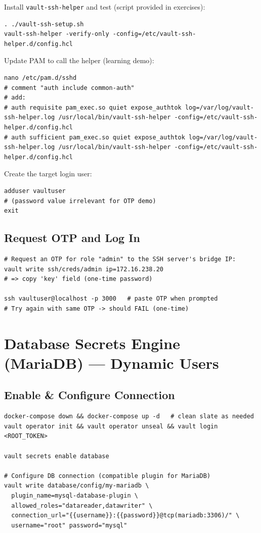 \documentclass[11pt]{article}
\begin{document}
Install \texttt{vault-ssh-helper} and test (script provided in exercises):
\begin{verbatim}
. ./vault-ssh-setup.sh
vault-ssh-helper -verify-only -config=/etc/vault-ssh-helper.d/config.hcl
\end{verbatim}

Update PAM to call the helper (learning demo):
\begin{verbatim}
nano /etc/pam.d/sshd
# comment "auth include common-auth"
# add:
# auth requisite pam_exec.so quiet expose_authtok log=/var/log/vault-ssh-helper.log /usr/local/bin/vault-ssh-helper -config=/etc/vault-ssh-helper.d/config.hcl
# auth sufficient pam_exec.so quiet expose_authtok log=/var/log/vault-ssh-helper.log /usr/local/bin/vault-ssh-helper -config=/etc/vault-ssh-helper.d/config.hcl
\end{verbatim}

Create the target login user:
\begin{verbatim}
adduser vaultuser
# (password value irrelevant for OTP demo)
exit
\end{verbatim}

\subsection*{Request OTP and Log In}
\begin{verbatim}
# Request an OTP for role "admin" to the SSH server's bridge IP:
vault write ssh/creds/admin ip=172.16.238.20
# => copy 'key' field (one-time password)

ssh vaultuser@localhost -p 3000   # paste OTP when prompted
# Try again with same OTP -> should FAIL (one-time)
\end{verbatim}

\section{Database Secrets Engine (MariaDB) — Dynamic Users}
\subsection*{Enable \& Configure Connection}
\begin{verbatim}
docker-compose down && docker-compose up -d   # clean slate as needed
vault operator init && vault operator unseal && vault login <ROOT_TOKEN>

vault secrets enable database

# Configure DB connection (compatible plugin for MariaDB)
vault write database/config/my-mariadb \
  plugin_name=mysql-database-plugin \
  allowed_roles="datareader,datawriter" \
  connection_url="{{username}}:{{password}}@tcp(mariadb:3306)/" \
  username="root" password="mysql"
\end{verbatim}
\clearpage
\end{document}
